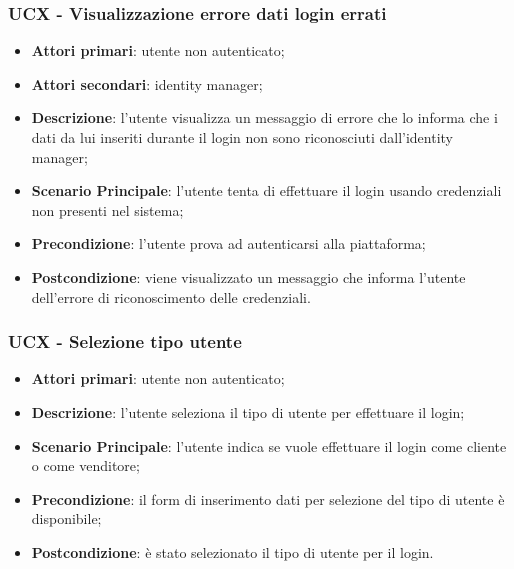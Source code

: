 \subsubsection{UCX - Visualizzazione errore dati login errati}
\begin{itemize}
\item \textbf{Attori primari}: utente non autenticato;
\item \textbf{Attori secondari}: identity manager;
\item \textbf{Descrizione}: l'utente visualizza un messaggio di errore che lo informa che i dati da lui inseriti durante il login non sono riconosciuti dall'identity manager;
\item \textbf{Scenario Principale}: l'utente tenta di effettuare il login usando credenziali non presenti nel sistema;
\item \textbf{Precondizione}: l'utente prova ad autenticarsi alla piattaforma;
\item \textbf{Postcondizione}: viene visualizzato un messaggio che informa l'utente dell'errore di riconoscimento delle credenziali.
\end{itemize}

\subsubsection{UCX - Selezione tipo utente}
\begin{itemize}
\item \textbf{Attori primari}: utente non autenticato;
\item \textbf{Descrizione}: l'utente seleziona il tipo di utente per effettuare il login;
\item \textbf{Scenario Principale}: l'utente indica se vuole effettuare il login come cliente o come venditore;
\item \textbf{Precondizione}: il form di inserimento dati per selezione del tipo di utente è disponibile;
\item \textbf{Postcondizione}: è stato selezionato il tipo di utente per il login.
\end{itemize}

